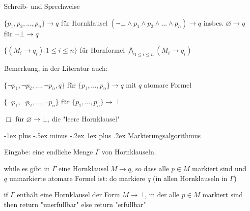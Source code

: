 \documentclass[a4paper]{article}
\makeatletter
\renewcommand{\subsubsection}{\@startsection{subsubsection}{3}{0mm}%
                {-1ex plus -.5ex minus -.2ex}%
                {1ex plus .2ex}%
                {\normalfont\small\bfseries}}
\makeatother
\begin{document}
\begin{multicols}{3}
  Schreib- und Sprechweise
  \begin{itemize*}
    \item $\{p_1,p_2 ,... ,p_n\}\rightarrow q$ für Hornklausel $(\lnot\bot\wedge p_1 \wedge p_2 \wedge ...\wedge p_n)\rightarrow q$
    insbes. $\varnothing\rightarrow q$ für $\lnot\bot\rightarrow q$
    \item $\{(M_i\rightarrow q_i)| 1 \leq i\leq n\}$ für Hornformel $\bigwedge_{1 \leq i \leq n} (M_i\rightarrow q_i)$
  \end{itemize*}

  Bemerkung, in der Literatur auch:
  \begin{itemize*}
    \item $\{\lnot p_1,\lnot p_2 ,... ,\lnot p_n,q\}$ für $\{p_1 ,... ,p_n\}\rightarrow q$ mit $q$ atomare Formel
    \item $\{\lnot p_1,\lnot p_2 ,... ,\lnot p_n\}$ für $\{p_1 ,... ,p_n\}\rightarrow\bot$
    \item $\Box$ für $\varnothing\rightarrow\bot$, die "leere Hornklausel"
  \end{itemize*}

  \subsubsection{Markierungsalgorithmus}
  \begin{itemize*}
    \item Eingabe: eine endliche Menge $\Gamma$ von Hornklauseln.
  \end{itemize*}
  \begin{enumerate*}
    \item while es gibt in $\Gamma$ eine Hornklausel $M\rightarrow q$, so dass alle $p\in M$ markiert sind und $q$ unmarkierte atomare Formel ist:
    do markiere $q$ (in allen Hornklauseln in $\Gamma$)
    \item if $\Gamma$ enthält eine Hornklausel der Form $M\rightarrow\bot$, in der alle $p\in M$ markiert sind
    then return "unerfüllbar"
    else return "erfüllbar"
  \end{enumerate*}


\end{multicols}
\end{document}
